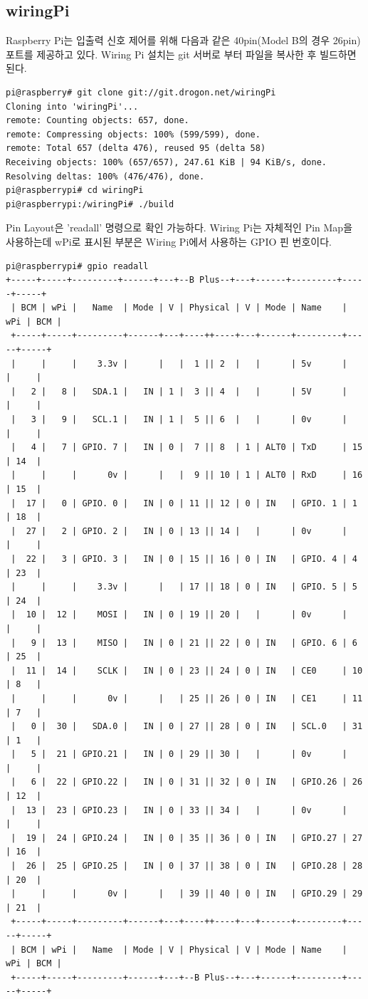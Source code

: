 \documentclass[11pt
  , a4paper
  , article
  , oneside
]{memoir}
\begin{document}
\subsection{wiringPi}
Raspberry Pi는 입출력 신호 제어를 위해 다음과 같은 40pin(Model B의 경우 26pin) 포트를 제공하고 있다.
Wiring Pi 설치는 git 서버로 부터 파일을 복사한 후 빌드하면 된다.
\begin{lstlisting}[style=termstyle]
pi@raspberry# git clone git://git.drogon.net/wiringPi
Cloning into 'wiringPi'...
remote: Counting objects: 657, done.
remote: Compressing objects: 100% (599/599), done.
remote: Total 657 (delta 476), reused 95 (delta 58)
Receiving objects: 100% (657/657), 247.61 KiB | 94 KiB/s, done.
Resolving deltas: 100% (476/476), done.
pi@raspberrypi# cd wiringPi
pi@raspberrypi:/wiringPi# ./build
\end{lstlisting}
Pin Layout은 'readall' 명령으로 확인 가능하다. Wiring Pi는 자체적인 Pin Map을 사용하는데 wPi로 표시된 부분은 Wiring Pi에서 사용하는 GPIO 핀 번호이다.
\begin{lstlisting}[style=termstyle]
pi@raspberrypi# gpio readall
+-----+-----+---------+------+---+--B Plus--+---+------+---------+-----+-----+
 | BCM | wPi |   Name  | Mode | V | Physical | V | Mode | Name    | wPi | BCM |
 +-----+-----+---------+------+---+----++----+---+------+---------+-----+-----+
 |     |     |    3.3v |      |   |  1 || 2  |   |      | 5v      |     |     |
 |   2 |   8 |   SDA.1 |   IN | 1 |  3 || 4  |   |      | 5V      |     |     |
 |   3 |   9 |   SCL.1 |   IN | 1 |  5 || 6  |   |      | 0v      |     |     |
 |   4 |   7 | GPIO. 7 |   IN | 0 |  7 || 8  | 1 | ALT0 | TxD     | 15  | 14  |
 |     |     |      0v |      |   |  9 || 10 | 1 | ALT0 | RxD     | 16  | 15  |
 |  17 |   0 | GPIO. 0 |   IN | 0 | 11 || 12 | 0 | IN   | GPIO. 1 | 1   | 18  |
 |  27 |   2 | GPIO. 2 |   IN | 0 | 13 || 14 |   |      | 0v      |     |     |
 |  22 |   3 | GPIO. 3 |   IN | 0 | 15 || 16 | 0 | IN   | GPIO. 4 | 4   | 23  |
 |     |     |    3.3v |      |   | 17 || 18 | 0 | IN   | GPIO. 5 | 5   | 24  |
 |  10 |  12 |    MOSI |   IN | 0 | 19 || 20 |   |      | 0v      |     |     |
 |   9 |  13 |    MISO |   IN | 0 | 21 || 22 | 0 | IN   | GPIO. 6 | 6   | 25  |
 |  11 |  14 |    SCLK |   IN | 0 | 23 || 24 | 0 | IN   | CE0     | 10  | 8   |
 |     |     |      0v |      |   | 25 || 26 | 0 | IN   | CE1     | 11  | 7   |
 |   0 |  30 |   SDA.0 |   IN | 0 | 27 || 28 | 0 | IN   | SCL.0   | 31  | 1   |
 |   5 |  21 | GPIO.21 |   IN | 0 | 29 || 30 |   |      | 0v      |     |     |
 |   6 |  22 | GPIO.22 |   IN | 0 | 31 || 32 | 0 | IN   | GPIO.26 | 26  | 12  |
 |  13 |  23 | GPIO.23 |   IN | 0 | 33 || 34 |   |      | 0v      |     |     |
 |  19 |  24 | GPIO.24 |   IN | 0 | 35 || 36 | 0 | IN   | GPIO.27 | 27  | 16  |
 |  26 |  25 | GPIO.25 |   IN | 0 | 37 || 38 | 0 | IN   | GPIO.28 | 28  | 20  |
 |     |     |      0v |      |   | 39 || 40 | 0 | IN   | GPIO.29 | 29  | 21  |
 +-----+-----+---------+------+---+----++----+---+------+---------+-----+-----+
 | BCM | wPi |   Name  | Mode | V | Physical | V | Mode | Name    | wPi | BCM |
 +-----+-----+---------+------+---+--B Plus--+---+------+---------+-----+-----+
\end{lstlisting}
\end{document}
